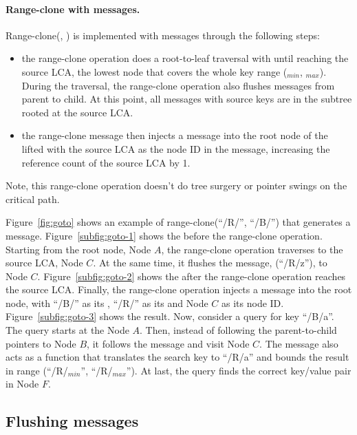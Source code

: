 \paragraph{Range-clone with \goto messages.}

Range-clone(\spre, \dpre) is implemented with \goto messages through the
following steps:
\begin{itemize}
\item the range-clone operation does a root-to-leaf traversal with \spre
until reaching the source LCA, the lowest node that covers the whole key range
(\spre$_{min}$, \spre$_{max}$).
During the traversal, the range-clone operation also flushes messages from
parent to child.
At this point, all messages with source keys are in the subtree rooted at the
source LCA.
\item the range-clone message then injects a \goto message into the root node of
the lifted \bedag with the source LCA as the node ID in the \goto message,
increasing the reference count of the source LCA by 1.
\end{itemize}
Note, this range-clone operation doesn't do tree surgery or pointer swings
on the critical path.

Figure~\ref{fig:goto} shows an example of range-clone(``/R/'', ``/B/'')
that generates a \goto message.
Figure~\ref{subfig:goto-1} shows the \bet before the range-clone operation.
Starting from the root node, Node $A$, the range-clone operation traverses to
the source LCA, Node $C$.
At the same time, it flushes the message, \delm(``/R/z''), to Node $C$.
Figure~\ref{subfig:goto-2} shows the \bet after the range-clone operation
reaches the source LCA.
Finally, the range-clone operation injects a \goto message into the root node,
with ``/B/'' as its \dpre, ``/R/'' as its \spre and Node $C$ as its node ID.
Figure~\ref{subfig:goto-3} shows the result.
Now, consider a query for key ``/B/a''.
The query starts at the Node $A$.
Then, instead of following the parent-to-child pointers to Node $B$, it follows
the \goto message and visit Node $C$.
The \goto message also acts as a \xf function that translates the search key
to ``/R/a'' and bounds the result in range (``/R/$_{min}$'', ``/R/$_{max}$'').
At last, the query finds the correct key/value pair in Node $F$.

\subsection{Flushing \goto messages}
\label{sec:rc:flush}

